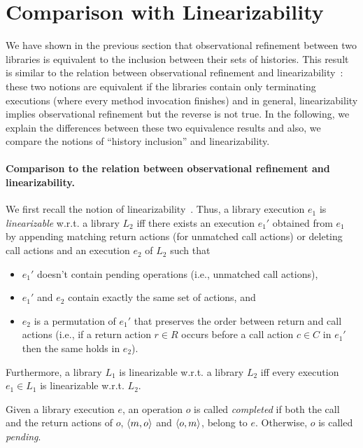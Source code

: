 \section{Comparison with Linearizability}
\label{sec:lin}


We have shown in the previous section that observational refinement between two libraries is 
equivalent to the inclusion between their sets of histories. This result is
similar to the relation between observational refinement and 
linearizability~\cite{journals/tcs/FilipovicORY10}: these two notions are equivalent if the libraries
contain only terminating executions (where every method invocation finishes) and in general,
linearizability implies observational refinement but the reverse is not true.
In the following, we explain the differences between these two equivalence results and also, we compare
the notions of ``history inclusion'' and linearizability.

\paragraph{Comparison to the relation between observational refinement and linearizability.}
We first recall the notion of
linearizability~\cite{journals/toplas/HerlihyW90}. Thus, a library execution $e_1$ is \emph{linearizable} w.r.t. a
library $L_2$ iff there exists an execution $e_1'$ obtained from $e_1$ by
appending matching return actions (for unmatched call actions) or deleting call actions
and an execution $e_2$ of $L_2$ such that 
\begin{itemize}
	\item $e_1'$ doesn't contain pending operations 
(i.e., unmatched call actions), 
	\item $e_1'$ and $e_2$ contain exactly the same set of actions, and 
	\item $e_2$ is a permutation of $e_1'$ that preserves the order between return and call
actions (i.e., if a return action $r\in R$ occurs before a call action $c\in C$
in $e_1'$ then the same holds in $e_2$). 
\end{itemize}
Furthermore, a library $L_1$ is linearizable
w.r.t. a library $L_2$ iff every execution $e_1\in L_1$ is linearizable w.r.t.
$L_2$. %

Given a library execution $e$, an 
operation $o$ is called \emph{completed} if both the call and the return actions of $o$, 
$\left\langle {m,o} \right\rangle$ and $\left\langle {o,m} \right\rangle$, belong to $e$. Otherwise, $o$ is called \emph{pending}.


